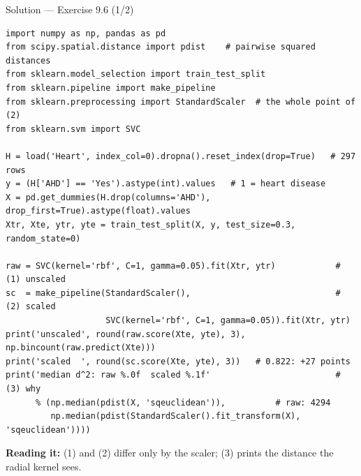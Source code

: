\documentclass[aspectratio=169,11pt]{beamer}
\begin{document}
\begin{frame}[fragile]{Solution --- Exercise 9.6 (1/2)}
\begin{solutionbox}
\begin{lstlisting}[basicstyle=\ttfamily\tiny]
import numpy as np, pandas as pd
from scipy.spatial.distance import pdist    # pairwise squared distances
from sklearn.model_selection import train_test_split
from sklearn.pipeline import make_pipeline
from sklearn.preprocessing import StandardScaler  # the whole point of (2)
from sklearn.svm import SVC

H = load('Heart', index_col=0).dropna().reset_index(drop=True)   # 297 rows
y = (H['AHD'] == 'Yes').astype(int).values   # 1 = heart disease
X = pd.get_dummies(H.drop(columns='AHD'), drop_first=True).astype(float).values
Xtr, Xte, ytr, yte = train_test_split(X, y, test_size=0.3, random_state=0)

raw = SVC(kernel='rbf', C=1, gamma=0.05).fit(Xtr, ytr)            # (1) unscaled
sc  = make_pipeline(StandardScaler(),                             # (2) scaled
                    SVC(kernel='rbf', C=1, gamma=0.05)).fit(Xtr, ytr)
print('unscaled', round(raw.score(Xte, yte), 3), np.bincount(raw.predict(Xte)))
print('scaled  ', round(sc.score(Xte, yte), 3))   # 0.822: +27 points
print('median d^2: raw %.0f  scaled %.1f'                         # (3) why
      % (np.median(pdist(X, 'sqeuclidean')),          # raw: 4294
         np.median(pdist(StandardScaler().fit_transform(X), 'sqeuclidean'))))
\end{lstlisting}
{\scriptsize\textbf{Reading it:} (1) and (2) differ only by the scaler; (3)
prints the distance the radial kernel sees.}
\end{solutionbox}
\end{frame}
\end{document}
